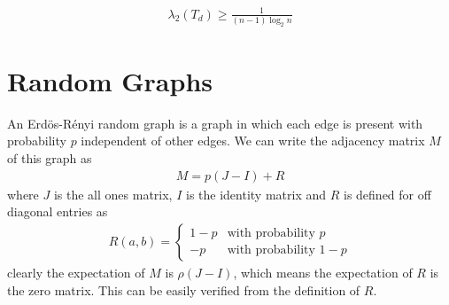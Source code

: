 \documentclass{math}
\begin{document}
\begin{lemma}
    \begin{align*}
        \lambda_2(T_d) \geq \frac{1}{(n - 1) \log_2 n}        
    \end{align*}
\end{lemma}

\section{Random Graphs}

An Erd\"{o}s-R\'{e}nyi random graph is a graph in which each edge is present with probability $p$ independent of other edges.
We can write the adjacency matrix $M$ of this graph as
\begin{align*}
    M = p(J - I) + R
\end{align*}
where $J$ is the all ones matrix, $I$ is the identity matrix and $R$ is defined for off diagonal entries as
\begin{align*}
    R(a, b) = \begin{cases}
        1 - p & \text{with probability $p$} \\
        -p & \text{with probability $1-p$}
    \end{cases}
\end{align*}
clearly the expectation of $M$ is $\rho(J - I)$, which means the expectation of $R$ is the zero matrix.
This can be easily verified from the definition of $R$.
\end{document}
